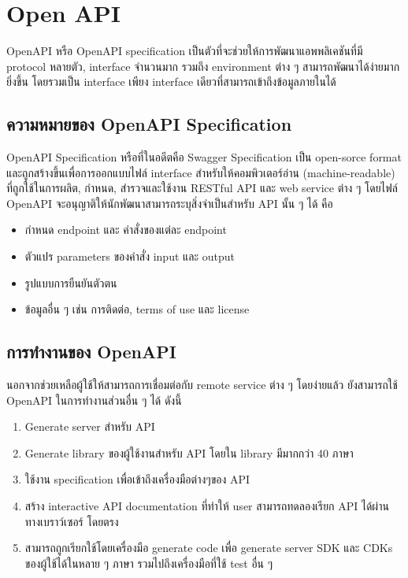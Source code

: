 \section{Open API}
    OpenAPI หรือ OpenAPI specification เป็นตัวที่จะช่วยให้การพัฒนาแอพพลิเคชันที่มี 
protocol หลายตัว, interface จํานวนมาก รวมถึง environment ต่าง ๆ สามารถพัฒนาได้ง่ายมากยิ่งขึ้น โดยรวมเป็น interface เพียง interface เดียวที่สามารถเข้าถึงข้อมูลภายในได้

\subsection{ความหมายของ OpenAPI Specification}
    OpenAPI Specification หรือที่ในอดีตคือ Swagger Specification เป็น open-sorce
format และถูกสร้างขึ้นเพื่อการออกแบบไฟล์ interface สําหรับให้คอมพิวเตอร์อ่าน (machine-readable)
ที่ถูกใช้ในการผลิต, กําหนด, สํารวจและใช้งาน RESTful API และ web service ต่าง ๆ โดยไฟล์
OpenAPI จะอนุญาติให้นักพัฒนาสามารถระบุสิ่งจําเป็นสําหรับ API นั้น ๆ ได้ คือ
\begin{itemize}[\textbullet]
    \item กําหนด endpoint และ คําสั่งของแต่ละ endpoint
    \item ตัวแปร parameters ของคําสั่ง input และ output
    \item รูปแบบการยืนยันตัวตน
    \item ข้อมูลอื่น ๆ เช่น การติดต่อ, terms of use และ license
\end{itemize}
\subsection{การทํางานของ OpenAPI}
    นอกจากช่วยเหลือผู้ใช้ให้สามารถการเชื่อมต่อกับ remote service ต่าง ๆ โดยง่ายแล้ว
ยังสามารถใช้ OpenAPI ในการทํางานส่วนอื่น ๆ ได้ ดังนี้
        \begin{enumerate}
            \item Generate server สําหรับ API
            \item Generate library ของผู้ใช้งานสําหรับ API โดยใน library มีมากกว่า 40 ภาษา
            \item ใช้งาน specification เพื่อเข้าถึงเครื่องมือต่างๆของ API
            \item สร้าง interactive API documentation ที่ทําให้ user สามารถทดลองเรียก API ได้ผ่านทางเบราว์เซอร์ โดยตรง
            \item สามารถถูกเรียกใช้โดยเครื่องมือ generate code เพื่อ generate server SDK และ CDKs ของผู้ใช้ได้ในหลาย ๆ ภาษา รวมไปถึงเครื่องมือที่ใช้ test อื่น ๆ
        \end{enumerate}

